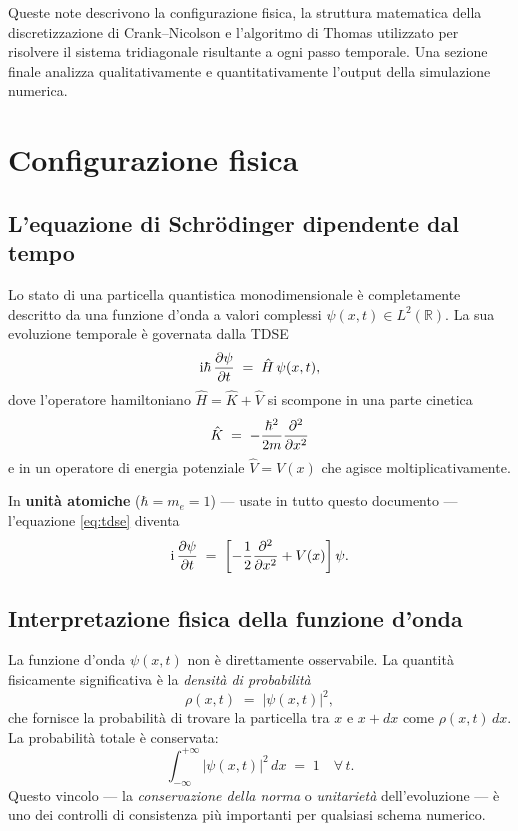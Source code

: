 \documentclass[12pt, a4paper]{article}
\newcommand{\ii}{\mathrm{i}}          %
\newcommand{\CN}{Crank--Nicolson}
\newcommand{\Htop}{\hat{H}}
\newcommand{\Ktop}{\hat{K}}
\newcommand{\Vtop}{\hat{V}}
\begin{document}
Queste note descrivono la configurazione fisica, la struttura matematica
della discretizzazione di \CN{} e l'algoritmo di Thomas utilizzato per
risolvere il sistema tridiagonale risultante a ogni passo temporale.
Una sezione finale analizza qualitativamente e quantitativamente
l'output della simulazione numerica.

\section{Configurazione fisica}

\subsection{L'equazione di Schr\"{o}dinger dipendente dal tempo}

Lo stato di una particella quantistica monodimensionale è completamente
descritto da una funzione d'onda a valori complessi
$\psi(x,t) \in L^2(\mathbb{R})$.  La sua evoluzione temporale è
governata dalla TDSE
\begin{equation}
  \ii\hbar\,\pdv{\psi}{t}(x,t) \;=\; \Htop\,\psi(x,t),
  \label{eq:tdse}
\end{equation}
dove l'operatore hamiltoniano $\Htop = \Ktop + \Vtop$ si scompone in
una parte cinetica
\begin{equation}
  \Ktop \;=\; -\frac{\hbar^2}{2m}\pdv[2]{}{x}
\end{equation}
e in un operatore di energia potenziale $\Vtop = V(x)$ che agisce
moltiplicativamente.

In \textbf{unità atomiche} ($\hbar = m_e = 1$) --- usate in tutto
questo documento --- l'equazione \eqref{eq:tdse} diventa
\begin{equation}
  \ii\,\pdv{\psi}{t} \;=\;
  \left[-\frac{1}{2}\pdv[2]{}{x} + V(x)\right]\psi.
  \label{eq:tdse_au}
\end{equation}

\subsection{Interpretazione fisica della funzione d'onda}

La funzione d'onda $\psi(x,t)$ non è direttamente osservabile.
La quantità fisicamente significativa è la \emph{densità di
probabilità}
\begin{equation}
  \rho(x,t) \;=\; |\psi(x,t)|^2,
\end{equation}
che fornisce la probabilità di trovare la particella tra $x$ e $x+dx$
come $\rho(x,t)\,dx$.  La probabilità totale è conservata:
\begin{equation}
  \int_{-\infty}^{+\infty} |\psi(x,t)|^2\,dx \;=\; 1
  \quad \forall\, t.
  \label{eq:norm}
\end{equation}
Questo vincolo --- la \emph{conservazione della norma} o
\emph{unitarietà} dell'evoluzione --- è uno dei controlli di
consistenza più importanti per qualsiasi schema numerico.
\end{document}
